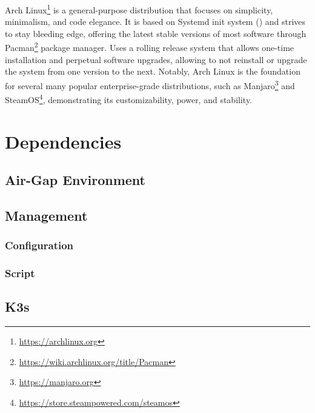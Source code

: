 Arch Linux\footnote{\url{https://archlinux.org}} is a general-purpose
distribution that focuses on simplicity, minimalism, and code elegance. It is based
on Systemd init system () %
and strives to stay bleeding edge, offering the latest stable versions of most
software through Pacman\footnote{\url{https://wiki.archlinux.org/title/Pacman}}
package manager. Uses a rolling release system that allows one-time installation
and perpetual software upgrades, allowing to not reinstall or upgrade the system
from one version to the next. Notably, Arch Linux is the foundation for several
many popular enterprise-grade distributions, such as Manjaro\footnote{\url{https://manjaro.org}}
and SteamOS\footnote{\url{https://store.steampowered.com/steamos}},
demonstrating its customizability, power, and stability\cite{arch_linux}.

\section{Dependencies}
\label{sec:implementation_dependencies}


\subsection{Air-Gap Environment}
\label{subsec:implementation_dependencies_air_gap_environment}

\subsection{Management}
\label{subsec:implementation_dependencies_management}

\subsubsection{Configuration}
\label{subsec:implementation_dependencies_management_configuration}

\subsubsection{Script}
\label{subsec:implementation_dependencies_management_script}

\subsection{K3s}
\label{subsec:implementation_dependencies_k3s}

